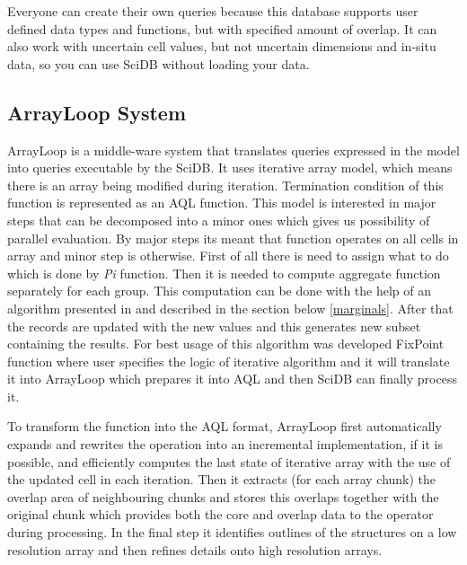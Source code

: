 Everyone can create their own queries because this database supports user defined data types and functions, but with specified amount of overlap. It can also work with uncertain cell values, but not uncertain dimensions and in-situ data, so you can use SciDB without loading your data.

\subsection{ArrayLoop System}
ArrayLoop is a middle-ware system that translates queries expressed in the model into queries executable by the SciDB. It uses iterative array model, which means there is an array being modified during iteration. Termination condition of this function is represented as an AQL function. This model is interested in major steps that can be decomposed into a minor ones which gives us possibility of parallel evaluation. By major steps its meant that function operates on all cells in array and minor step is otherwise. First of all there is need to assign what to do which is done by \textit{Pi} function. Then it is needed to compute aggregate function separately for each group.  This computation can be done with the help of an algorithm presented in \cite{marginals} and described in the section below \ref{marginals}. After that the records are updated with the new values and this generates new subset containing the results.
For best usage of this algorithm was developed FixPoint function where user specifies the logic of iterative algorithm and it will translate it into ArrayLoop which prepares it into AQL and then SciDB can finally process it.

To transform the function into the AQL format, ArrayLoop first automatically expands and rewrites the operation into an incremental implementation, if it is possible, and efficiently computes the last state of iterative array with the use of the updated cell in each iteration. Then it extracts (for each array chunk) the overlap area of neighbouring chunks and stores this overlaps together with the original chunk which provides both the core and overlap data to the operator during processing. In the final step it identifies outlines of the structures on a low resolution array and then refines details onto high resolution arrays. \cite{arrayloop}

